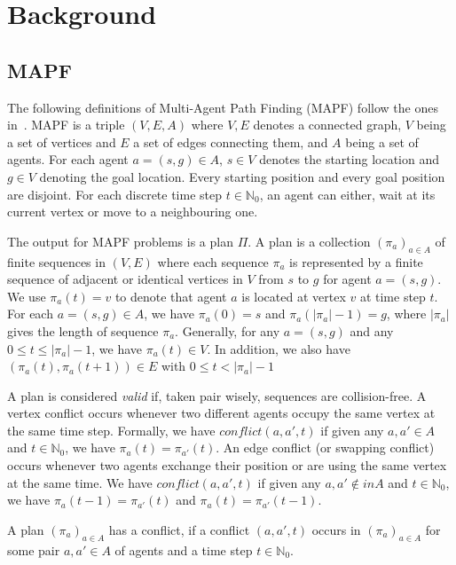 \section{Background}\label{sec:background}

\subsection{MAPF}\label{sec:background_mapf}

The following definitions of Multi-Agent Path Finding (MAPF) follow the ones in~\cite{husvobbass22a}. MAPF is a triple $(V,E,A)$ where \(V,E\) denotes a connected graph, \(V\) being a set of vertices and \(E\) a set of edges connecting them, and \(A\) being a set of agents. For each agent \(a=(s,g) \in A\), \(s \in V\) denotes the starting location and \(g \in V\) denoting the goal location. Every starting position and every goal position are disjoint.
For each discrete time step \(t\in \mathbb{N}_0\), an agent can either, wait at its current vertex or move to a neighbouring one.

The output for MAPF problems is a plan \(\Pi\). A plan is a collection $(\pi_a)_{a\in A}$ of finite sequences in $(V,E)$ where each sequence $\pi_a$ is represented by a finite sequence of adjacent or identical vertices in $V$ from $s$ to $g$ for agent $a = (s,g)$. We use \(\pi_a (t) = v\) to denote that agent \(a\) is located at vertex \(v\) at time step \(t\). 
For each \(a=(s,g) \in A\), we have $\pi_a(0) = s$ and  $\pi_a(|\pi_a|-1) = g$, where $|\pi_a|$ gives the length of sequence $\pi_a$. Generally, for any \(a=(s,g)\) and any $0 \leq t \leq |\pi_a|-1$, we have \(\pi_a(t) \in V\). In addition, we also have $(\pi_a(t),\pi_a(t+1))\in E$ with $0 \leq t < |\pi_a|-1$

A plan is considered  \textit{valid} if, taken pair wisely, sequences are collision-free. A vertex conflict occurs whenever two different agents occupy the same vertex at the same time step. Formally, we have \(conflict(a,a',t)\) if given any $a,a'\in A$  and $t\in\mathbb{N}_0$, we have $\pi_a(t) = \pi_{a'}(t)$. An edge conflict (or swapping conflict) occurs whenever two agents exchange their position or are using the same vertex at the same time. We have \(conflict(a,a',t)\) if given any $a,a'\notin in A$  and $t\in\mathbb{N}_0$, we have $\pi_a(t-1) = \pi_{a'}(t)$ and $\pi_a(t) = \pi_{a'}(t-1)$.

A plan $(\pi_a)_{a\in A}$ has a conflict, if a conflict $(a, a',t)$ occurs in $(\pi_a)_{a\in A}$ for some pair $a,a'\in A$ of agents and a time step $t\in\mathbb{N}_0$.


